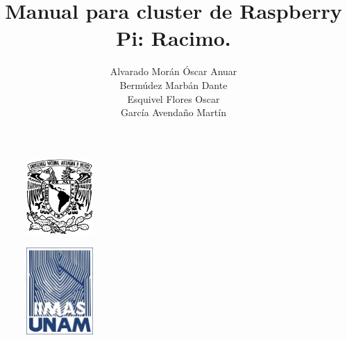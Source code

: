 \documentclass[twocolumn, letterpaper,aps,pra,10pt]{revtex4-1}
\begin{document}
\renewcommand{\figurename}{{\bf Figura }}
\renewcommand{\tablename}{{\bf Tabla}}
\renewcommand{\thesection}{\arabic{section}}
\renewcommand{\thesubsection}{\arabic{subsection}}

\begin{figure}
\flushleft \includegraphics[width=1in]{unam_logo.jpg}
\end{figure}
\begin{figure}
\flushright \includegraphics[width=1in]{iimas.jpg}
\end{figure}

\lhead{}
\rhead{}
\cfoot{\thepage}
\rfoot{}

\vspace*{-1cm}
\title{Manual para cluster de Raspberry Pi: Racimo.}
\author{Alvarado Morán Óscar Anuar \\Bermúdez Marbán Dante \\Esquivel Flores Oscar \\García Avendaño Martín}

\maketitle


\begin{thebibliography}{99}
\end{thebibliography}
\end{document}
